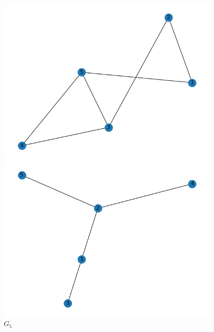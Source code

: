 \documentclass[11pt,a4paper,openright,oneside]{book}
\numberwithin{equation}{section}
\begin{document}
{\begin{figure}[H]
   \begin{minipage}[t]{0.32\linewidth}
        \centering
        \includegraphics[width=\linewidth]{media/graph-backprop-4.png}
        \caption*{$G_4$}
    \end{minipage}
    \begin{minipage}[t]{0.32\linewidth}
        \centering
        \includegraphics[width=\linewidth]{media/graph-backprop-5.png}
        \caption*{$G_5$}
    \end{minipage}
    \begin{minipage}[t]{0.32\linewidth}
        \centering

\end{minipage}
\end{figure}}
\end{document}
